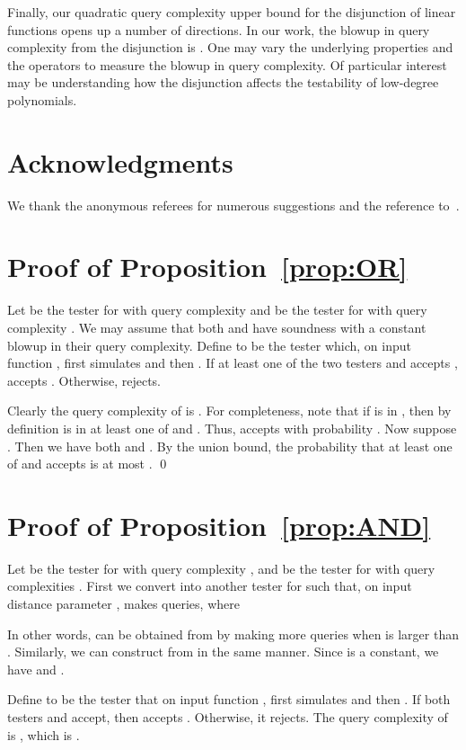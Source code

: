 \documentclass[11pt,english]{article}
\theoremstyle{definition}
\theoremstyle{remark}
\begin{document}
Finally, our quadratic query complexity upper bound 
for the disjunction of linear functions opens up a number of directions.
In our work, the blowup in query complexity from the disjunction is . 
One may vary the underlying properties and the operators to measure the blowup in query complexity. 
Of particular interest may be understanding 
how the disjunction affects the testability of low-degree polynomials.

\section*{Acknowledgments}
We thank the anonymous referees for numerous suggestions and the reference to~\cite{GOSSW}.




\appendix


\section{Proof of Proposition~\ref{prop:OR}}
\label{Sec:union proof} 
Let  be the tester for  with query complexity 
 and  be the tester for  with query complexity 
. 
We may assume that both  and  have soundness  
with a constant blowup in their query complexity. 
Define  to be the tester which, on input function , first simulates  and then . 
If at least one of the two testers  and  accepts ,  accepts . 
Otherwise,  rejects.  


Clearly the query complexity of  is . 
For completeness, note that if  is in , then by definition  is in at least
one of  and . Thus,  accepts  with probability . 
Now suppose . 
Then we have both 
and . 
By the union bound, the probability that at least one of  and  accepts  is at most
. \qed

\section{Proof of Proposition~\ref{prop:AND}} \label{sec:intersection proof}
Let  be the tester for  with query complexity , 
and  be the tester for  with query complexities . 
First we convert  into another tester 
for  such that, on input distance parameter , 
makes  queries, where

In other words,  can be obtained from  by making more queries 
when  is larger than . 
Similarly, we can construct  from  in the same manner. 
Since  is a constant, we have  and .

Define  to be the tester that on input function , first
simulates  and then . 
If both testers  and  accept, then  accepts . 
Otherwise, it rejects. 
The query complexity of  is , which is .
\end{document}
